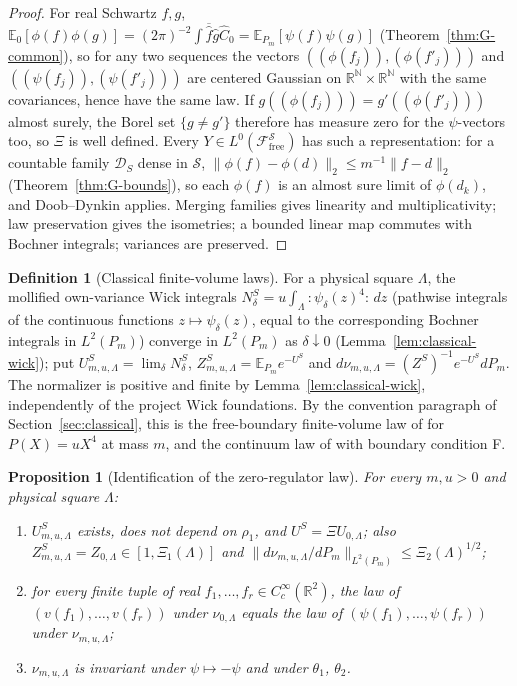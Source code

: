 \documentclass[11pt]{article}
\theoremstyle{plain}
\newtheorem{proposition}[theorem]{Proposition}
\theoremstyle{definition}
\newtheorem{definition}[theorem]{Definition}
\theoremstyle{remark}
\newcommand{\R}{\mathbb{R}}
\newcommand{\N}{\mathbb{N}}
\newcommand{\E}{\mathbb{E}}
\newcommand{\cD}{\mathcal{D}}
\newcommand{\cF}{\mathcal{F}}
\newcommand{\cS}{\mathcal{S}}
\newcommand{\conj}[1]{\overline{#1}}
\begin{document}
\begin{proof}
For real Schwartz $f,g$,
$\E_0[\phi(f)\phi(g)]=(2\pi)^{-2}\int\conj{\hat f}\hat g\hat C_0=\E_{P_m}[\psi(f)\psi(g)]$
(Theorem~\ref{thm:G-common}), so for any two sequences the vectors
$((\phi(f_j)),(\phi(f'_j)))$ and $((\psi(f_j)),(\psi(f'_j)))$ are centered Gaussian on
$\R^{\N}\times\R^{\N}$ with the same covariances, hence have the same law. If
$g((\phi(f_j)))=g'((\phi(f'_j)))$ almost surely, the Borel set $\{g\ne g'\}$ therefore
has measure zero for the $\psi$-vectors too, so $\Xi$ is well defined. Every
$Y\in L^{0}(\cF^{\cS}_{\mathrm{free}})$ has such a representation: for a countable family
$\cD_S$ dense in $\cS$, $\|\phi(f)-\phi(d)\|_2\le m^{-1}\|f-d\|_2$
(Theorem~\ref{thm:G-bounds}), so each $\phi(f)$ is an almost sure limit of
$\phi(d_k)$, and Doob--Dynkin applies. Merging families gives linearity and
multiplicativity; law preservation gives the isometries; a bounded linear map
commutes with Bochner integrals; variances are preserved.
\end{proof}

\begin{definition}[Classical finite-volume laws]\label{def:classical-laws}
For a physical square $\Lambda$, the mollified own-variance Wick integrals
$N^{S}_\delta=u\int_\Lambda{:}\psi_\delta(z)^{4}{:}\,dz$ (pathwise integrals of the continuous
functions $z\mapsto\psi_\delta(z)$, equal to the corresponding Bochner integrals in
$L^{2}(P_m)$) converge in $L^{2}(P_m)$ as $\delta\downarrow0$
(Lemma~\ref{lem:classical-wick}); put $U^{S}_{m,u,\Lambda}=\lim_\delta N^{S}_\delta$,
$Z^{S}_{m,u,\Lambda}=\E_{P_m}e^{-U^{S}}$ and
$d\nu_{m,u,\Lambda}=(Z^{S})^{-1}e^{-U^{S}}dP_m$. The normalizer is positive and
finite by Lemma~\ref{lem:classical-wick}, independently of the project Wick
foundations. By the convention paragraph of
Section~\ref{sec:classical}, this is the free-boundary finite-volume law of
\cite[(1.1), pp.~496--497]{FS1977} for $P(X)=uX^{4}$ at mass $m$, and the
continuum law of \cite[\S IX]{GRS1976} with boundary condition F.
\end{definition}

\begin{proposition}[Identification of the zero-regulator law]\label{prop:identify}
For every $m,u>0$ and physical square $\Lambda$:
\begin{enumerate}[label=(\roman*)]
\item $U^{S}_{m,u,\Lambda}$ exists, does not depend on $\rho_1$, and
  $U^{S}=\Xi U_{0,\Lambda}$; also $Z^{S}_{m,u,\Lambda}=Z_{0,\Lambda}\in[1,\Xi_1(\Lambda)]$ and
  $\|d\nu_{m,u,\Lambda}/dP_m\|_{L^{2}(P_m)}\le\Xi_2(\Lambda)^{1/2}$;
\item for every finite tuple of real $f_1,\dots,f_r\in C_c^{\infty}(\R^{2})$, the law of
  $(v(f_1),\dots,v(f_r))$ under $\nu_{0,\Lambda}$ equals the law of
  $(\psi(f_1),\dots,\psi(f_r))$ under $\nu_{m,u,\Lambda}$;
\item $\nu_{m,u,\Lambda}$ is invariant under $\psi\mapsto-\psi$ and under $\theta_1$, $\theta_2$.
\end{enumerate}
\end{proposition}
\end{document}

